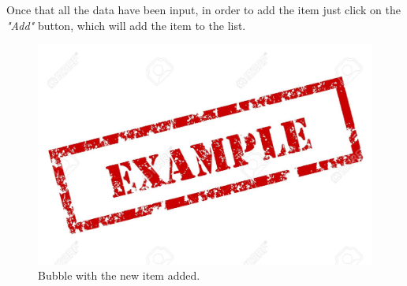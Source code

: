 Once that all the data have been input, in order to add the item just click on the \textit{"Add"} button, which will add the item to the list.

\begin{figure}[H]
  \centering 
  \includegraphics[width=\textwidth]{Sections/3-HowToUse/Images/example.jpeg}
  \caption{Bubble with the new item added.}
\end{figure}